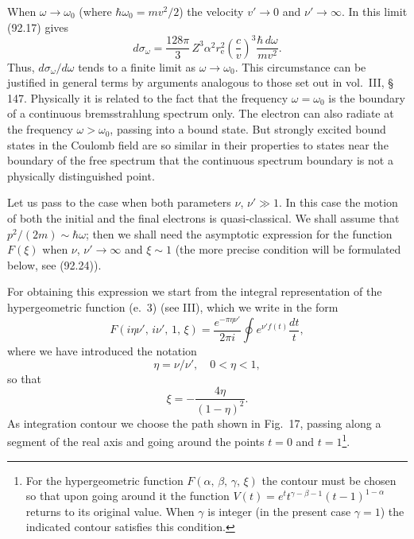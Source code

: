 
When $\omega \to \omega_0$ (where $\hbar\omega_0 = mv^2/2$) the velocity $v' \to 0$ and $\nu' \to \infty$. In this limit (92.17) gives
\begin{equation}
d\sigma_\omega = \frac{128\pi}{3}\,Z^3\alpha^2 r_\mathrm{e}^2\left(\frac{c}{v}\right)^{\!3}\frac{\hbar\,d\omega}{mv^2}.
\label{eq:92.18}
\end{equation}
Thus, $d\sigma_\omega/d\omega$ tends to a finite limit as $\omega \to \omega_0$. This circumstance can be justified in general terms by arguments analogous to those set out in vol.~III, \S\,147. Physically it is related to the fact that the frequency $\omega = \omega_0$ is the boundary of a continuous bremsstrahlung spectrum only. The electron can also radiate at the frequency $\omega > \omega_0$, passing into a bound state. But strongly excited bound states in the Coulomb field are so similar in their properties to states near the boundary of the free spectrum that the continuous spectrum boundary is not a physically distinguished point.

Let us pass to the case when both parameters $\nu$, $\nu' \gg 1$. In this case the motion of both the initial and the final electrons is quasi-classical. We shall assume that $p^2/(2m) \sim \hbar\omega$; then we shall need the asymptotic expression for the function $F(\xi)$ when $\nu$, $\nu' \to \infty$ and $\xi \sim 1$ (the more precise condition will be formulated below, see (92.24)).

For obtaining this expression we start from the integral representation of the hypergeometric function (e.~3) (see III), which we write in the form
\begin{equation}
F(i\eta\nu',\,i\nu',\,1,\,\xi) = \frac{e^{-\pi\eta\nu'}}{2\pi i}\oint e^{\nu' f(t)}\frac{dt}{t},
\label{eq:92.19}
\end{equation}
where we have introduced the notation
\begin{equation}
\eta = \nu/\nu', \quad 0 < \eta < 1,
\label{eq:92.19a}
\end{equation}
so that
\begin{equation}
\xi = -\frac{4\eta}{(1-\eta)^2}.
\label{eq:92.20}
\end{equation}
As integration contour we choose the path shown in Fig.~17, passing along a segment of the real axis and going around the points $t = 0$ and $t = 1$\footnote{For the hypergeometric function $F(\alpha,\,\beta,\,\gamma,\,\xi)$ the contour must be chosen so that upon going around it the function $V(t) = e^t t^{\gamma-\beta-1}(t-1)^{1-\alpha}$ returns to its original value. When $\gamma$ is integer (in the present case $\gamma = 1$) the indicated contour satisfies this condition.}.

